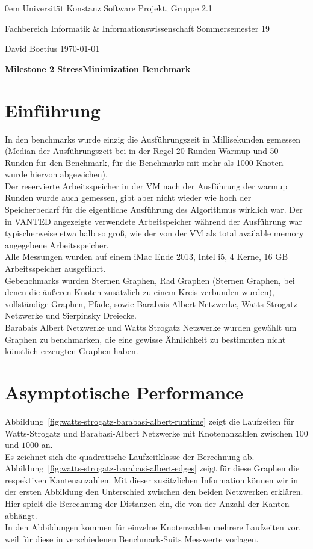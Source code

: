 \documentclass[]{article}
\date{}
\begin{document}
{\footnotesize \parindent0em
    {\sc Universität Konstanz} \hfill {\sc Software Projekt, Gruppe 2.1}\par
    {\sc Fachbereich Informatik \& Informationswissenschaft} \hfill Sommersemester 19 \par
    David Boetius \hfill \today\par
    \bigskip
    \begin{center}
    {\LARGE\bf Milestone 2 StressMinimization Benchmark}
    \bigskip
    \end{center}
}

\section{Einführung}

In den benchmarks wurde einzig die Ausführungszeit in Millisekunden gemessen (Median der Ausführungszeit bei in der Regel 20 Runden Warmup und 50 Runden für den Benchmark, für die Benchmarks mit mehr als 1000 Knoten wurde hiervon abgewichen). \\ 
Der reservierte Arbeitsspeicher in der VM nach der Ausführung der warmup Runden wurde auch gemessen, gibt aber nicht wieder wie hoch der Speicherbedarf für die eigentliche Ausführung des Algorithmus wirklich war. Der in VANTED angezeigte verwendete Arbeitspeicher während der Ausführung war typischerweise etwa halb so groß, wie der von der VM als total available memory angegebene Arbeitsspeicher. \\
Alle Messungen wurden auf einem iMac Ende 2013, Intel i5, 4 Kerne, 16 GB Arbeitsspeicher ausgeführt. \\
Gebenchmarks wurden Sternen Graphen, Rad Graphen (Sternen Graphen, bei denen die äußeren Knoten zusätzlich zu einem Kreis verbunden wurden), vollständige Graphen, Pfade, sowie Barabais Albert Netzwerke, Watts Strogatz Netzwerke und Sierpinsky Dreiecke. \\
Barabais Albert Netzwerke und Watts Strogatz Netzwerke wurden gewählt um Graphen zu benchmarken, die eine gewisse Ähnlichkeit zu bestimmten nicht künstlich erzeugten Graphen haben. 

\section{Asymptotische Performance}

Abbildung~\ref{fig:watts-strogatz-barabasi-albert-runtime} zeigt die Laufzeiten für Watts-Strogatz und Barabasi-Albert Netzwerke mit Knotenanzahlen zwischen $100$ und $1000$ an. \\
Es zeichnet sich die quadratische Laufzeitklasse der Berechnung ab.
 Abbildung~\ref{fig:watts-strogatz-barabasi-albert-edges} zeigt für diese Graphen die respektiven Kantenanzahlen. Mit dieser zusätzlichen Information können wir in der ersten Abbildung den Unterschied zwischen den beiden Netzwerken erklären. Hier spielt die Berechnung der Distanzen ein, die von der Anzahl der Kanten abhängt. \\
 In den Abbildungen kommen für einzelne Knotenzahlen mehrere Laufzeiten vor, weil für diese in verschiedenen Benchmark-Suits Messwerte vorlagen. 
\end{document}
